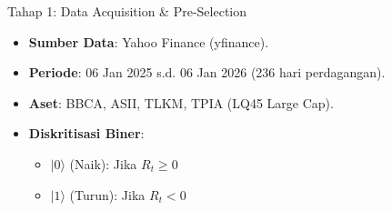 \documentclass{beamer}
\begin{document}
\begin{frame}{Tahap 1: Data Acquisition \& Pre-Selection}
    \begin{itemize}
        \item \textbf{Sumber Data}: Yahoo Finance (yfinance).
        \item \textbf{Periode}: 06 Jan 2025 s.d. 06 Jan 2026 (236 hari perdagangan).
        \item \textbf{Aset}: BBCA, ASII, TLKM, TPIA (LQ45 Large Cap).
    \end{itemize}
    \begin{table}[]
        \centering
        \caption{Statistik Daily Log Return ($R_t = \ln(P_t / P_{t-1})$)}
    \end{table}
    \begin{itemize}
        \item \textbf{Diskritisasi Biner}:
        \begin{itemize}
            \item $|0\rangle$ (Naik): Jika $R_t \ge 0$
            \item $|1\rangle$ (Turun): Jika $R_t < 0$
        \end{itemize}
    \end{itemize}
\end{frame}
\end{document}

